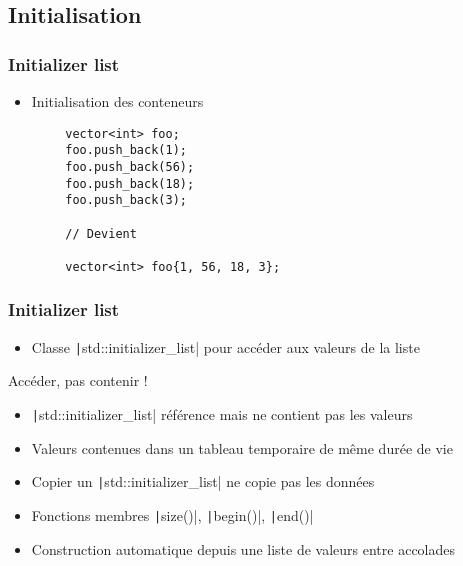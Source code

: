 \documentclass[C++.tex]{subfiles}
\begin{document}
\subsection*{Initialisation}
\begin{frame}[fragile]
	\frametitle{Initializer list}
	\begin{itemize}
		\item Initialisation des conteneurs
	\end{itemize}

	\begin{verbatim}
		vector<int> foo;
		foo.push_back(1);
		foo.push_back(56);
		foo.push_back(18);
		foo.push_back(3);

		// Devient

		vector<int> foo{1, 56, 18, 3};
	\end{verbatim}

\end{frame}

\begin{frame}[fragile]
	\frametitle{Initializer list}
	\begin{itemize}
		\item Classe \texttt|std::initializer_list| pour accéder aux valeurs de la liste
	\end{itemize}

	\begin{alertblock}{Accéder, pas contenir !}
		\begin{itemize}
			\item \texttt|std::initializer_list| référence mais ne contient pas les valeurs
			\item Valeurs contenues dans un tableau temporaire de même durée de vie
			\item Copier un \texttt|std::initializer_list| ne copie pas les données
		\end{itemize}
	\end{alertblock}		

	\begin{itemize}
		\item Fonctions membres \texttt|size()|, \texttt|begin()|, \texttt|end()|
		\item Construction automatique depuis une liste de valeurs entre accolades
	\end{itemize}
\end{frame}
\end{document}
